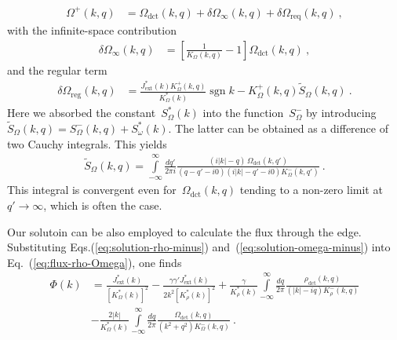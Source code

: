 \documentclass[preprint,aps,eqsecnum, prb]{revtex4-1}
\newcommand{\fplus}[1]{{#1}^{+}}
\newcommand{\fminus}[1]{{#1}^{-}}
\newcommand{\sgn}{\mathop{\mathrm{sgn}}\nolimits}
\newcommand{\dct}[1]{{#1}_\mathrm{dct}}
\begin{document}
\begin{align}
  \label{eq:solution-omega-plus}
  \fplus{\Omega}(k, q) &= \dct{\Omega}(k, q)
                           + \delta\Omega_{\infty}(k, q)
                           + \delta\Omega_\mathrm{req}(k, q)\ ,
\end{align}
with the infinite-space contribution
\begin{align}
  \delta\Omega_\mathrm{\infty}(k, q) &=
        \left[\frac{1}{K_\Omega(k, q)} - 1 \right] \dct{\Omega}(k, q)\ ,
\end{align}
and the regular term
\begin{align}
  \delta\Omega_\mathrm{reg}(k, q) &=
  \frac{J_\mathrm{ext}^\ast(k) \fplus{K}_\Omega(k, q)}{K_\Omega^\ast(k)}
                                    \sgn{k}
  - \fplus{K}_\Omega(k, q) {\tilde S}_\Omega(k, q)
  \ .
\end{align}
Here we absorbed the constant~$S_\Omega^\ast(k)$
into the function~$\fminus{S}_\Omega$ by introducing
${\tilde S}_\Omega(k, q) = \fminus{S}_\Omega(k, q) + S_\omega^\ast(k)$.
The latter can be obtained as a difference of  two  Cauchy integrals.
This yields
\begin{align}
  \label{eq:solution-psi}
  {\tilde{S}}_\Omega(k, q) = \int\limits_{-\infty}^{\infty}
  \frac{dq'}{2\pi i} \frac{(i|k| - q) \,
  \dct{\Omega}(k, q')}{(q - q' - i0)(i|k| - q' - i0) \fminus{K}_\Omega(k, q')}
  \ .
\end{align}
This integral is convergent even for~$\dct{\Omega}(k, q)$
tending to a non-zero limit at~$q'\to \infty$, which is often the case.

Our solutoin
can be also  employed to calculate the flux through the edge. Substituting
Eqs.(\ref{eq:solution-rho-minus}) and~(\ref{eq:solution-omega-minus})
into Eq.~(\ref{eq:flux-rho-Omega}),
one finds
\begin{align}
  \label{eq:phi-general}
  \Phi(k) &= \frac{J_\mathrm{ext}^\ast(k)}{\left[K_\Omega^\ast(k)\right]^2}
  - \frac{\gamma \gamma' J_\mathrm{ext}^\ast(k)}{2k^2 \left[K_\rho^\ast(k)\right]^2}
  + \frac{\gamma}{K_\rho^\ast(k)} \int\limits_{-\infty}^{\infty}
    \frac{dq}{2\pi}
  \frac{\dct{\rho}(k, q)}{(|k| - i q) \fminus{K}_\rho(k, q)}
  \nonumber
  \\
   &- \frac{2|k|}{K_\Omega^\ast(k)} \int\limits_{-\infty}^{\infty}
     \frac{dq}{2\pi}
     \frac{\dct{\Omega}(k, q)}{(k^2 + q^2)\fminus{K}_\Omega(k, q)}
    \ .
\end{align}
\end{document}
